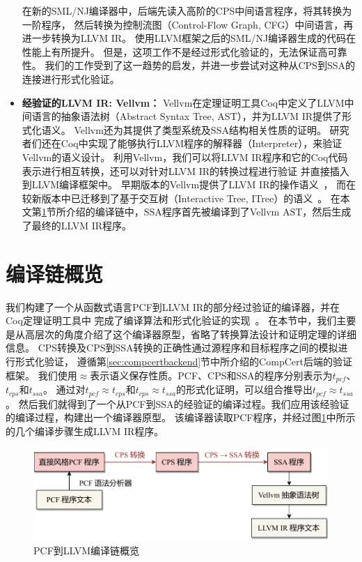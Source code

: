 \begin{itemize}
    在新的SML/NJ编译器中，后端先读入高阶的CPS中间语言程序，将其转换为一阶程序，
    然后转换为控制流图（Control-Flow Graph, CFG）中间语言，再进一步转换为LLVM IR。
    使用LLVM框架之后的SML/NJ编译器生成的代码在性能上有所提升。
    但是，这项工作不是经过形式化验证的，无法保证高可靠性。
    我们的工作受到了这一趋势的启发，并进一步尝试对这种从CPS到SSA的连接进行形式化验证。
    \item \textbf{经验证的LLVM IR: Vellvm：} 
    Vellvm在定理证明工具Coq中定义了LLVM中间语言的抽象语法树（Abstract Syntax Tree, AST），并为LLVM IR提供了形式化语义。
    Vellvm还为其提供了类型系统及SSA结构相关性质的证明。
    研究者们还在Coq中实现了能够执行LLVM程序的解释器（Interpreter），来验证Vellvm的语义设计。
    利用Vellvm，我们可以将LLVM IR程序和它的Coq代码表示进行相互转换，还可以对针对LLVM IR的转换过程进行验证
    并直接插入到LLVM编译框架中。
    早期版本的Vellvm提供了LLVM IR的操作语义~\cite{zhao2012formalizing}，
    而在较新版本中已迁移到了基于交互树（Interactive Tree, ITree）的语义~\cite{zakowski2021modular}。
    在本文第\ref{sec:overview}节所介绍的编译链中，SSA程序首先被编译到了Vellvm AST，然后生成了最终的LLVM IR程序。
\end{itemize}

\section{编译链概览} \label{sec:overview}

我们构建了一个从函数式语言PCF到LLVM IR的部分经过验证的编译器，并在Coq定理证明工具中
完成了编译算法和形式化验证的实现~\cite{chlipala2022certified}。
在本节中，我们主要是从高层次的角度介绍了这个编译器原型，省略了转换算法设计和证明定理的详细信息。
CPS转换及CPS到SSA转换的正确性通过源程序和目标程序之间的模拟进行形式化验证，
遵循第\ref{sec:compcertbackend}节中所介绍的CompCert后端的验证框架。
我们使用$\approx $表示语义保存性质。PCF、CPS和SSA的程序分别表示为$t_{pcf}$、$t_{cps}$和$t_{ssa}$。
通过对$t_{pcf}\approx t_{cps}$和$t_{cps}\approx t_{ssa}$的形式化证明，可以组合推导出$t_{pcf}\approx t_{ssa}$。
然后我们就得到了一个从PCF到SSA的经验证的编译过程。我们应用该经验证的编译过程，构建出一个编译器原型。
该编译器读取PCF程序，并经过图\ref{overview}中所示的几个编译步骤生成LLVM IR程序。

\begin{figure}[htbp]
    \centering
    \vspace{2ex}
    \includegraphics[width=0.8\linewidth]{figures/overview.pdf}
    \caption{PCF到LLVM编译链概览}\label{overview}
\end{figure}

